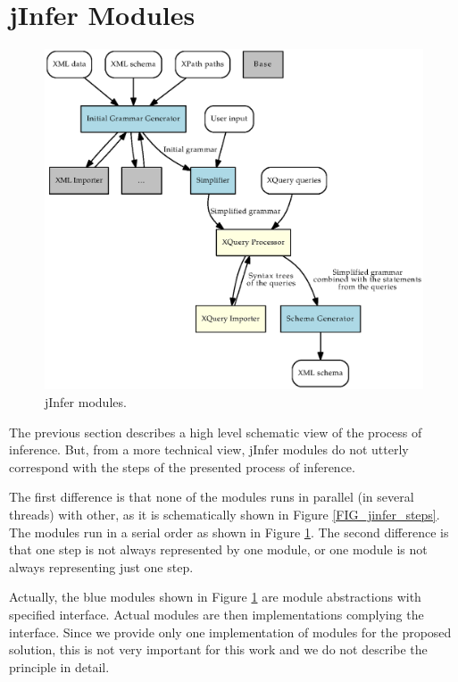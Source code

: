\section{jInfer Modules}
\begin{figure}
\label{FIG_jinfer_modules}
\caption{jInfer modules.}
\includegraphics[scale=0.8]{jinfer_modules.eps}
\end{figure}

The previous section describes a high level schematic view of the process of inference. But, from a more technical view, jInfer modules do not utterly correspond with the steps of the presented process of inference.

The first difference is that none of the modules runs in parallel (in several threads) with other, as it is schematically shown in Figure \ref{FIG_jinfer_steps}. The modules run in a serial order as shown in Figure \ref{FIG_jinfer_modules}. The second difference is that one step is not always represented by one module, or one module is not always representing just one step.

Actually, the blue modules shown in Figure \ref{FIG_jinfer_modules} are module abstractions with specified interface. Actual modules are then implementations complying the interface. Since we provide only one implementation of modules for the proposed solution, this is not very important for this work and we do not describe the principle in detail.

